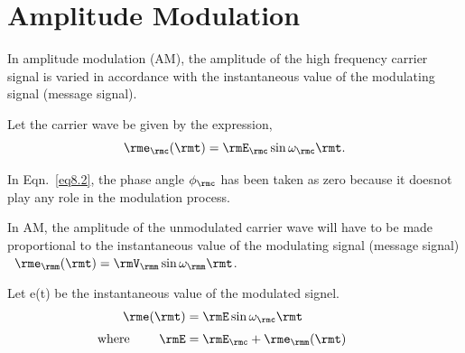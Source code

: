 \section{Amplitude Modulation}\label{sec8.5}

In amplitude modulation (AM), the amplitude of the high frequency
carrier signal is varied in accordance with the instantaneous value of
the modulating signal (message signal).

\smallskip

Let the carrier wave be given by the expression,
\begin{equation}
\rme_{\rmc}(\rmt) = \rmE_{\rmc} \sin \omega_{\rmc} \rmt.\label{eq8.2}
\end{equation}

In Eqn.~\eqref{eq8.2}, the phase angle $\phi_{\rmc}$ has been taken as
zero because it doesnot play any role in the modulation process.

In AM, the amplitude of the unmodulated carrier wave will have to be
made proportional to the instantaneous value of the modulating signal
(message signal) ~${\rme}_{\rmm}(\rmt) =
{\rmV}_{\rmm} \sin \omega_{\rmm} {\rmt}$.

Let e(t) be the instantaneous value of the modulated signel.
\begin{align}
\rme(\rmt) & = \rmE \sin \omega_{\rmc} \rmt\label{eq8.3}\\[3pt]
\text{where } \qquad \rmE & = \rmE_{\rmc} + \rme_{\rmm} (\rmt) \qquad \label{eq8.4}
\end{align}

